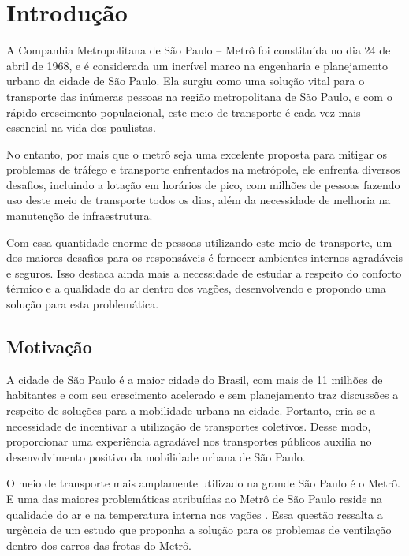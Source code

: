 \documentclass[acronym,symbols]{fei}
\begin{document}



\listoffigures
\listoftables
\tableofcontents

\chapter{Introdução}

A Companhia Metropolitana de São Paulo – Metrô foi constituída no dia 24 de abril de 1968, e é considerada um incrível marco na engenharia e planejamento urbano da cidade de São Paulo. Ela surgiu como uma solução vital para o transporte das inúmeras pessoas na região metropolitana de São Paulo, e com o rápido crescimento populacional, este meio de transporte é cada vez mais essencial na vida dos paulistas. 

No entanto, por mais que o metrô seja uma excelente proposta para mitigar os problemas de tráfego e transporte enfrentados na metrópole, ele enfrenta diversos desafios, incluindo a lotação em horários de pico, com milhões de pessoas fazendo uso deste meio de transporte todos os dias, além da necessidade de melhoria na manutenção de infraestrutura.

Com essa quantidade enorme de pessoas utilizando este meio de transporte, um dos maiores desafios para os responsáveis é fornecer ambientes internos agradáveis e seguros. Isso destaca ainda mais a necessidade de estudar a respeito do conforto térmico e a qualidade do ar dentro dos vagões, desenvolvendo e propondo uma solução para esta problemática.

\section{Motivação}

A cidade de São Paulo é a maior cidade do Brasil, com mais de 11 milhões de habitantes \cite{IBGE} e com seu crescimento acelerado e sem planejamento traz discussões a respeito de soluções para a mobilidade urbana na cidade. Portanto, cria-se a necessidade de incentivar a utilização de transportes coletivos. Desse modo, proporcionar uma experiência agradável nos transportes públicos auxilia no desenvolvimento positivo da mobilidade urbana de São Paulo.

O meio de transporte mais amplamente utilizado na grande São Paulo é o Metrô. E uma das maiores problemáticas atribuídas ao Metrô de São Paulo reside na qualidade do ar e na temperatura interna nos vagões \cite{MetroSP}. 
Essa questão ressalta a urgência de um estudo que proponha a solução para os problemas de ventilação dentro dos carros das frotas do Metrô.
\end{document}

